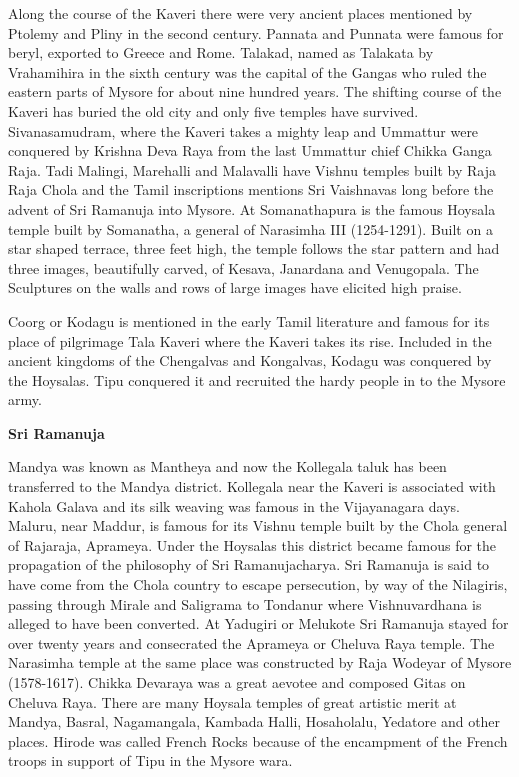 \documentclass{book}
\begin{document}
Along the course of the Kaveri there were very ancient places
mentioned by Ptolemy and Pliny in the second century. Pannata and
Punnata were famous for beryl, exported to Greece and Rome. Talakad,
named as Talakata by Vrahamihira in the sixth century was the capital
of the Gangas who ruled the eastern parts of Mysore for about nine
hundred years. The shifting course of the Kaveri has buried the old
city and only five temples have survived. Sivanasamudram, where the
Kaveri takes a mighty leap and Ummattur were conquered by Krishna Deva
Raya from the last Ummattur chief Chikka Ganga Raja. Tadi Malingi,
Marehalli and Malavalli have Vishnu temples built by Raja Raja Chola
and the Tamil inscriptions mentions Sri Vaishnavas long before the
advent of Sri Ramanuja into Mysore. At Somanathapura is the famous
Hoysala temple built by Somanatha, a general of Narasimha III
(1254-1291). Built on a star shaped terrace, three feet high, the
temple follows the star pattern and had three images, beautifully
carved, of Kesava, Janardana and Venugopala. The Sculptures on the
walls and rows of large images have elicited high praise. 

Coorg or Kodagu is mentioned in the early Tamil literature and famous
for its place of pilgrimage Tala Kaveri where the Kaveri takes its
rise. Included in the ancient kingdoms of the Chengalvas and
Kongalvas, Kodagu was conquered by the Hoysalas. Tipu  conquered it
and recruited the hardy people in to the Mysore army.

\begin{center}
{\bf Sri Ramanuja}
\end{center}

Mandya was known as Mantheya and now the Kollegala taluk has been
transferred to the Mandya district. Kollegala near the Kaveri is
associated with Kahola Galava and its silk weaving was famous in the
Vijayanagara days. Maluru, near Maddur, is famous for its Vishnu
temple built by the Chola general of Rajaraja, Aprameya. Under the
Hoysalas this district became famous for the propagation of the
philosophy of Sri Ramanujacharya. Sri Ramanuja is said to have come
from the Chola country to escape persecution, by way of the Nilagiris,
passing through Mirale and Saligrama to Tondanur where Vishnuvardhana
is alleged to have been converted. At Yadugiri or  Melukote Sri
Ramanuja stayed for over twenty years and consecrated the Aprameya or
Cheluva Raya temple. The Narasimha temple at the same place was
constructed by Raja Wodeyar of Mysore (1578-1617). Chikka Devaraya was
a great aevotee and composed Gitas on Cheluva Raya. There are many
Hoysala temples of great artistic merit at Mandya, Basral,
Nagamangala, Kambada Halli, Hosaholalu, Yedatore and other
places. Hirode was called French Rocks because of the encampment of
the French troops in support of Tipu in the Mysore wara.
\end{document}

